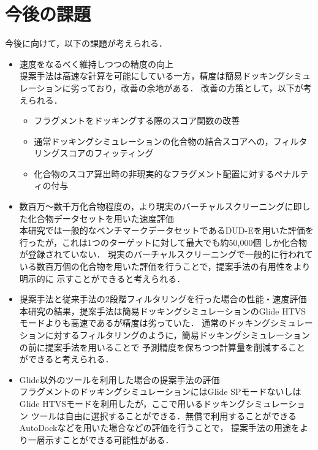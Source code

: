 \section{今後の課題}
今後に向けて，以下の課題が考えられる．
\begin{itemize}
\item 速度をなるべく維持しつつの精度の向上\\
	提案手法は高速な計算を可能にしている一方，精度は簡易ドッキングシミュレーションに劣っており，改善の余地がある．
	改善の方策として，以下が考えられる．
	\begin{itemize}
	\item フラグメントをドッキングする際のスコア関数の改善
	\item 通常ドッキングシミュレーションの化合物の結合スコアへの，フィルタリングスコアのフィッティング
	\item 化合物のスコア算出時の非現実的なフラグメント配置に対するペナルティの付与
	\end{itemize}
\item 数百万～数千万化合物程度の，より現実のバーチャルスクリーニングに即した化合物データセットを用いた速度評価\\
	本研究では一般的なベンチマークデータセットであるDUD-Eを用いた評価を行ったが，これは1つのターゲットに対して最大でも約50,000個
	しか化合物が登録されていない．
	現実のバーチャルスクリーニングで一般的に行われている数百万個の化合物を用いた評価を行うことで，提案手法の有用性をより明示的に
	示すことができると考えられる．
\item 提案手法と従来手法の2段階フィルタリングを行った場合の性能・速度評価\\
	本研究の結果，提案手法は簡易ドッキングシミュレーションのGlide HTVSモードよりも高速であるが精度は劣っていた．
	通常のドッキングシミュレーションに対するフィルタリングのように，簡易ドッキングシミュレーションの前に提案手法を用いることで
	予測精度を保ちつつ計算量を削減することができると考えられる．
\item Glide以外のツールを利用した場合の提案手法の評価\\
	フラグメントのドッキングシミュレーションにはGlide SPモードないしはGlide HTVSモードを利用したが，ここで用いるドッキングシミュレーション
	ツールは自由に選択することができる．無償で利用することができるAutoDockなどを用いた場合などの評価を行うことで，
	提案手法の用途をより一層示すことができる可能性がある．
\end{itemize}
